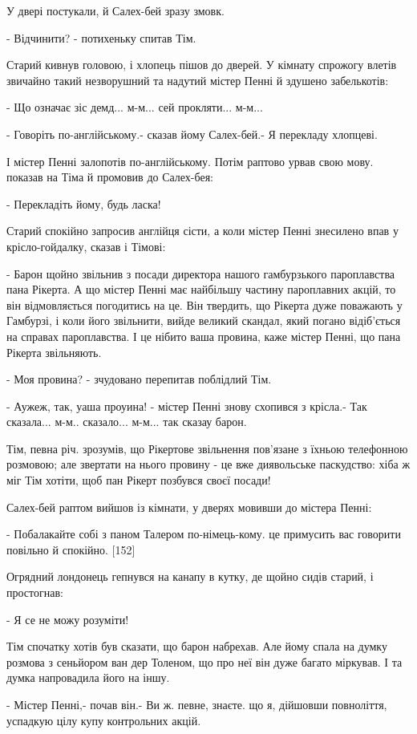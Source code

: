 У двері постукали, й Салех-бей зразу змовк.

- Відчинити? - потихеньку спитав Тім.

Старий кивнув головою, і хлопець пішов до дверей. У кімнату спрожогу влетів звичайно такий незворушний та надутий містер Пенні й здушено забелькотів:

- Що означає зіс демд... м-м... сей прокляти... м-м...

- Говоріть по-англійському.- сказав йому Салех-бей.- Я перекладу хлопцеві.

І містер Пенні залопотів по-англійському. Потім раптово урвав свою мову. показав на Тіма й промовив до Салех-бея:

- Перекладіть йому, будь ласка!

Старий спокійно запросив англійця сісти, а коли містер Пенні знесилено впав у крісло-гойдалку, сказав і Тімові:

- Барон щойно звільнив з посади директора нашого гамбурзького пароплавства пана Рікерта. А що містер Пенні має найбільшу частину пароплавних акцій, то він відмовляється погодитись на це. Він твердить, що Рікерта дуже поважають у Гамбурзі, і коли його звільнити, вийде великий скандал, який погано відіб'ється на справах пароплавства. І це нібито ваша провина, каже містер Пенні, що пана Рікерта звільняють.

- Моя провина? - зчудовано перепитав поблідлий Тім.

- Аужеж, так, уаша проуина! - містер Пенні знову схопився з крісла.- Так сказала... м-м.. сказало... м-м... так сказау барон.

Тім, певна річ. зрозумів, що Рікертове звільнення пов'язане з їхньою телефонною розмовою; але звертати на нього провину - це вже диявольське паскудство: хіба ж міг Тім хотіти, щоб пан Рікерт позбувся своєї посади!

Салех-бей раптом вийшов із кімнати, у дверях мовивши до містера Пенні:

- Побалакайте собі з паном Талером по-німець-кому. це примусить вас говорити повільно й спокійно. [152]

Огрядний лондонець гепнувся на канапу в кутку, де щойно сидів старий, і простогнав:

- Я се не можу розуміти!

Тім спочатку хотів був сказати, що барон набрехав. Але йому спала на думку розмова з сеньйором ван дер Толеном, що про неї він дуже багато міркував. І та думка напровадила його на іншу.

- Містер Пенні,- почав він.- Ви ж. певне, знаєте. що я, дійшовши повноліття, успадкую цілу купу контрольних акцій.

